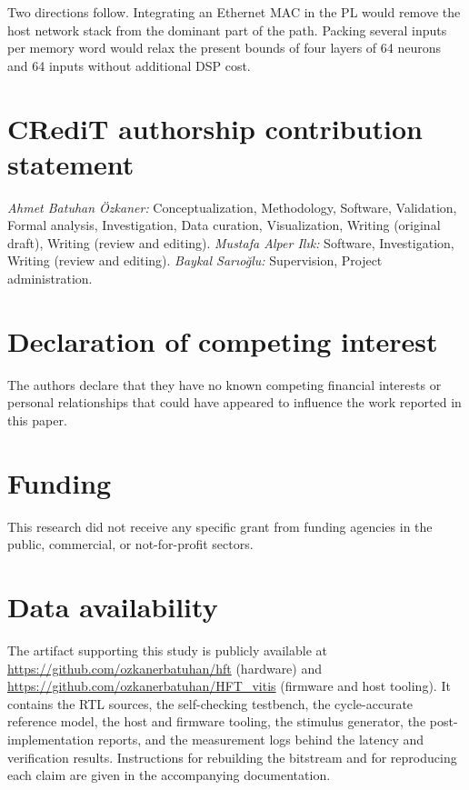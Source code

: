 \documentclass[final,5p,times,twocolumn]{elsarticle}
\begin{document}
Two directions follow. Integrating an Ethernet MAC in the PL would remove the
host network stack from the dominant part of the path. Packing several inputs per
memory word would relax the present bounds of four layers of 64 neurons and 64
inputs without additional DSP cost.


\section*{CRediT authorship contribution statement}
\noindent
\textit{Ahmet Batuhan \"Ozkaner:} Conceptualization, Methodology, Software,
Validation, Formal analysis, Investigation, Data curation, Visualization,
Writing (original draft), Writing (review and editing).
\textit{Mustafa Alper Il{\i}k:} Software, Investigation,
Writing (review and editing).
\textit{Baykal Sar{\i}o\u{g}lu:} Supervision, Project administration.

\section*{Declaration of competing interest}
The authors declare that they have no known competing financial interests or
personal relationships that could have appeared to influence the work reported
in this paper.

\section*{Funding}
This research did not receive any specific grant from funding agencies in the
public, commercial, or not-for-profit sectors.

\section*{Data availability}
The artifact supporting this study is publicly available at
\url{https://github.com/ozkanerbatuhan/hft} (hardware) and
\url{https://github.com/ozkanerbatuhan/HFT_vitis} (firmware and host tooling).
It contains the RTL sources, the self-checking
testbench, the cycle-accurate reference model, the host and firmware tooling, the
stimulus generator, the post-implementation reports, and the measurement logs
behind the latency and verification results. Instructions for rebuilding the
bitstream and for reproducing each claim are given in the accompanying
documentation.



\end{document}
